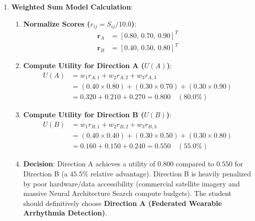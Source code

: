 \begin{enumerate}
    \item \textbf{Weighted Sum Model Calculation}:
    \begin{enumerate}
        \item \textbf{Normalize Scores ($r_{ij} = S_{ij} / 10.0$)}:
        \begin{align*}
        \mathbf{r}_A &= [0.80, \, 0.70, \, 0.90]^T \\
        \mathbf{r}_B &= [0.40, \, 0.50, \, 0.80]^T
        \end{align*}
        \item \textbf{Compute Utility for Direction A ($U(A)$)}:
        \begin{align*}
        U(A) &= w_1 r_{A,1} + w_2 r_{A,2} + w_3 r_{A,3} \\
        &= (0.40 \times 0.80) + (0.30 \times 0.70) + (0.30 \times 0.90) \\
        &= 0.320 + 0.210 + 0.270 = \mathbf{0.800} \quad (80.0\%)
        \end{align*}
        \item \textbf{Compute Utility for Direction B ($U(B)$)}:
        \begin{align*}
        U(B) &= w_1 r_{B,1} + w_2 r_{B,2} + w_3 r_{B,3} \\
        &= (0.40 \times 0.40) + (0.30 \times 0.50) + (0.30 \times 0.80) \\
        &= 0.160 + 0.150 + 0.240 = \mathbf{0.550} \quad (55.0\%)
        \end{align*}
        \item \textbf{Decision}:
        Direction A achieves a utility of $0.800$ compared to $0.550$ for Direction B (a $45.5\%$ relative advantage). Direction B is heavily penalized by poor hardware/data accessibility (commercial satellite imagery and massive Neural Architecture Search compute budgets). The student should definitively choose \textbf{Direction A (Federated Wearable Arrhythmia Detection)}.
    \end{enumerate}


\end{enumerate}
